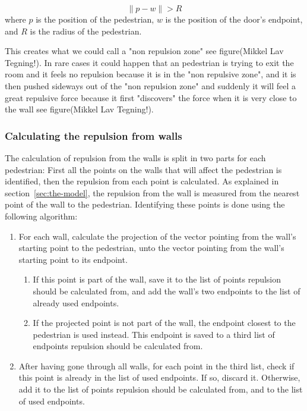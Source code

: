 \begin{equation}
\| p - w \| > R
\end{equation}
where $ p $ is the position of the pedestrian, $ w $ is the position of the door's endpoint, 
and $ R $ is the radius of the pedestrian.

This creates what we could call a "non repulsion zone" see figure(Mikkel Lav Tegning!).
In rare cases it could happen that an pedestrian is trying to exit the room and it feels 
no repulsion because it is in the "non repulsive zone", and it is then pushed sideways out 
of the "non repulsion zone" and suddenly it will feel a great repulsive force because 
it first "discovers" the force when it is very close to the wall see figure(Mikkel Lav Tegning!).

\subsubsection{Calculating the repulsion from walls}
\label{sec:repulsion-points}
The calculation of repulsion from the walls is split in two parts for each 
pedestrian: First all the points on the walls that will affect the pedestrian is 
identified, then the repulsion from each point is calculated. As explained in 
section~\ref{sec:the-model}, the repulsion from the wall is measured from the 
nearest point of the wall to the pedestrian. Identifying these points is done using 
the following algorithm:

\begin{enumerate}
    \item For each wall, calculate the projection of the vector pointing from 
        the wall's starting point to the pedestrian, unto the vector pointing from 
        the wall's starting point to its endpoint.
        \begin{enumerate}
            \item If this point is part of the wall, save it to the list of points 
                repulsion should be calculated from, and add the wall's two endpoints 
                to the list of already used endpoints.

            \item If the projected point is not part of the wall, the endpoint closest 
                to the pedestrian is used instead. This endpoint is saved to a 
                third list of endpoints repulsion should be calculated from.
        \end{enumerate}

    \item After having gone through all walls, for each point in the third 
        list, check if this point is already in the list of used endpoints. If 
        so, discard it. Otherwise, add it to the list of points repulsion 
        should be calculated from, and to the list of used endpoints.
\end{enumerate}


